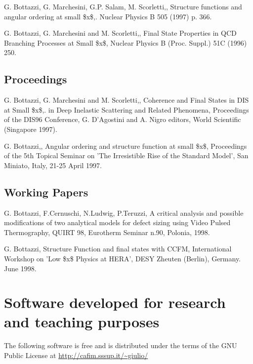 \documentclass[a4paper]{article}
\begin{document}
G. Bottazzi, G. Marchesini, G.P. Salam, M. Scorletti,, Structure
functions and angular ordering at small \$x\$,.  Nuclear Physics B
505 (1997) p. 366.

G. Bottazzi, G. Marchesini and M. Scorletti,, Final State Properties
in QCD Branching Processes at Small \$x\$, Nuclear Physics B
(Proc. Suppl.) 51C (1996) 250.


\subsection{Proceedings%
  \label{proceedings}%
}

G. Bottazzi, G. Marchesini and M. Scorletti,, Coherence and Final
States in DIS at Small \$x\$,.  in \textquotedbl{}Deep Inelastic Scattering and
Related Phenomena\textquotedbl{}, Proceedings of the DIS96 Conference, G.
D'Agostini and A. Nigro editors, World Scientific (Singapore
1997).

G. Bottazzi,, Angular ordering and structure function at small \$x\$,
Proceedings of the 5th Topical Seminar on 'The Irresistible Rise
of the Standard Model', San Miniato, Italy, 21-25 April 1997.


\subsection{Working Papers%
  \label{id1}%
}

G. Bottazzi, F.Cernuschi, N.Ludwig, P.Teruzzi, A critical analysis
and possible modifications of two analytical models for defect
sizing using Video Pulsed Thermography, QUIRT 98, Eurotherm
Seminar n.90, Polonia, 1998.

G. Bottazzi, Structure Function and final states with CCFM,
International Workshop on 'Low \$x\$ Physics at HERA', DESY
Zheuten (Berlin), Germany. June 1998.


\section{Software developed for research and teaching purposes%
  \label{software-developed-for-research-and-teaching-purposes}%
}

The following software is free and is distributed under the terms of
the GNU Public License at \url{http://cafim.sssup.it/~giulio/}
\end{document}
